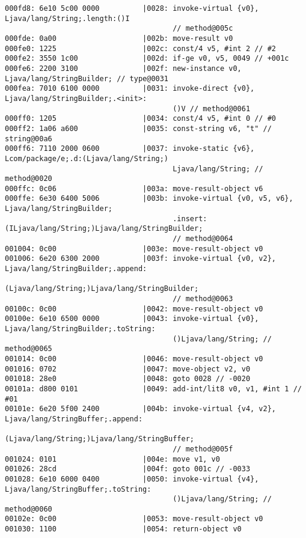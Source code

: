 \begin{lstlisting}
000fd8: 6e10 5c00 0000          |0028: invoke-virtual {v0}, Ljava/lang/String;.length:()I
                                       // method@005c
000fde: 0a00                    |002b: move-result v0
000fe0: 1225                    |002c: const/4 v5, #int 2 // #2
000fe2: 3550 1c00               |002d: if-ge v0, v5, 0049 // +001c
000fe6: 2200 3100               |002f: new-instance v0, Ljava/lang/StringBuilder; // type@0031
000fea: 7010 6100 0000          |0031: invoke-direct {v0}, Ljava/lang/StringBuilder;.<init>:
                                       ()V // method@0061
000ff0: 1205                    |0034: const/4 v5, #int 0 // #0
000ff2: 1a06 a600               |0035: const-string v6, "t" // string@00a6
000ff6: 7110 2000 0600          |0037: invoke-static {v6}, Lcom/package/e;.d:(Ljava/lang/String;)
                                       Ljava/lang/String; // method@0020
000ffc: 0c06                    |003a: move-result-object v6
000ffe: 6e30 6400 5006          |003b: invoke-virtual {v0, v5, v6}, Ljava/lang/StringBuilder;
                                       .insert:(ILjava/lang/String;)Ljava/lang/StringBuilder;
                                       // method@0064
001004: 0c00                    |003e: move-result-object v0
001006: 6e20 6300 2000          |003f: invoke-virtual {v0, v2}, Ljava/lang/StringBuilder;.append:
                                       (Ljava/lang/String;)Ljava/lang/StringBuilder;
                                       // method@0063
00100c: 0c00                    |0042: move-result-object v0
00100e: 6e10 6500 0000          |0043: invoke-virtual {v0}, Ljava/lang/StringBuilder;.toString:
                                       ()Ljava/lang/String; // method@0065
001014: 0c00                    |0046: move-result-object v0
001016: 0702                    |0047: move-object v2, v0
001018: 28e0                    |0048: goto 0028 // -0020
00101a: d800 0101               |0049: add-int/lit8 v0, v1, #int 1 // #01
00101e: 6e20 5f00 2400          |004b: invoke-virtual {v4, v2}, Ljava/lang/StringBuffer;.append:
                                       (Ljava/lang/String;)Ljava/lang/StringBuffer;
                                       // method@005f
001024: 0101                    |004e: move v1, v0
001026: 28cd                    |004f: goto 001c // -0033
001028: 6e10 6000 0400          |0050: invoke-virtual {v4}, Ljava/lang/StringBuffer;.toString:
                                       ()Ljava/lang/String; // method@0060
00102e: 0c00                    |0053: move-result-object v0
001030: 1100                    |0054: return-object v0

\end{lstlisting}
